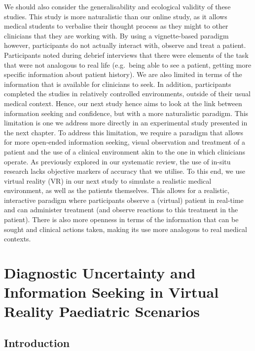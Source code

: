 \documentclass[a4paper, nobind]{templates/ociamthesis}
\begin{document}
We should also consider the generalisability and ecological validity of these studies. This study is more naturalistic than our online study, as it allows medical students to verbalise their thought process as they might to other clinicians that they are working with. By using a vignette-based paradigm however, participants do not actually interact with, observe and treat a patient. Participants noted during debrief interviews that there were elements of the task that were not analogous to real life (e.g.~being able to see a patient, getting more specific information about patient history). We are also limited in terms of the information that is available for clinicians to seek. In addition, participants completed the studies in relatively controlled environments, outside of their usual medical context. Hence, our next study hence aims to look at the link between information seeking and confidence, but with a more naturalistic paradigm. This limitation is one we address more directly in an experimental study presented in the next chapter. To address this limitation, we require a paradigm that allows for more open-ended information seeking, visual observation and treatment of a patient and the use of a clinical environment akin to the one in which clinicians operate. As previously explored in our systematic review, the use of in-situ research lacks objective markers of accuracy that we utilise. To this end, we use virtual reality (VR) in our next study to simulate a realistic medical environment, as well as the patients themselves. This allows for a realistic, interactive paradigm where participants observe a (virtual) patient in real-time and can administer treatment (and observe reactions to this treatment in the patient). There is also more openness in terms of the information that can be sought and clinical actions taken, making its use more analogous to real medical contexts.

\chapter{Diagnostic Uncertainty and Information Seeking in Virtual Reality Paediatric Scenarios}\label{chapter-5}

\adjustmtc
{}

\section{Introduction}\label{introduction-3}
\end{document}
